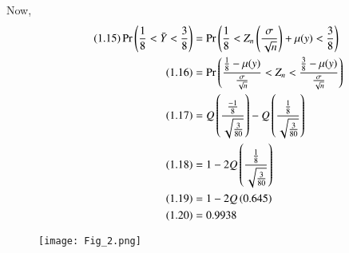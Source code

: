 \documentclass[journal,12pt,twocolumn]{IEEEtran}
\begin{document}
Now,
\begin{align}
\tag{1.15}
\Pr\left(\frac{1}{8}<\Bar{Y}<\frac{3}{8}\right)
&=\Pr\left(\frac{1}{8}<Z_{n}\left(\frac{\sigma}{\sqrt{n}}\right)+\mu(y)<\frac{3}{8}\right)\\
\tag{1.16}  
&=\Pr\left(\frac{\frac{1}{8}-\mu(y)}{\frac{\sigma}{\sqrt{n}}}<Z_{n}<\frac{\frac{3}{8}-\mu(y)}{\frac{\sigma}{\sqrt{n}}}\right)\\
\tag{1.17}
&=Q\left(\frac{\frac{-1}{8}}{\sqrt{\frac{3}{80}}}\right)-Q\left(\frac{\frac{1}{8}}{\sqrt{\frac{3}{80}}}\right)\\
\tag{1.18}
&=1-2Q\left(\frac{\frac{1}{8}}{\sqrt{\frac{3}{80}}}\right)\\
\tag{1.19}                             
&=1-2Q\left(0.645\right)\\
\tag{1.20}                             
&=0.9938
\end{align}
\begin{figure}[ht]
    \centering
    \texttt{[image: Fig\_2.png]}
    \caption{}
    \label{Fig_2}
\end{figure}
\end{document}
